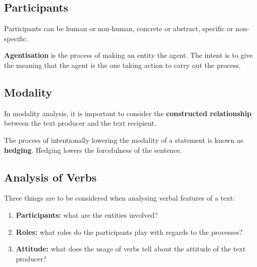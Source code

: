 \documentclass[../main.tex]{subfiles}
\begin{document}
	\subsection{Participants}
	Participants can be human or non-human, concrete or abstract, specific or non-specific.
	
	
	\textbf{Agentisation} is the process of making an entity the agent. The intent is to give the meaning that the agent is the one taking action to carry out the process. 
	
	\subsection{Modality}
	
	In modality analysis, it is important to consider the \textbf{constructed relationship} between the text producer and the text recipient.
	
	The process of intentionally lowering the modality of a statement is known as \textbf{hedging}. Hedging lowers the forcefulness of the sentence.
	

	\subsection{Analysis of Verbs}
	Three things are to be considered when analysing verbal features of a text:
	\begin{enumerate}
		\item \textbf{Participants:} what are the entities involved?
		\item \textbf{Roles:} what roles do the participants play with regards to the processes?
		\item \textbf{Attitude:} what does the usage of verbs tell about the attitude of the text producer?
	\end{enumerate}
\end{document}
